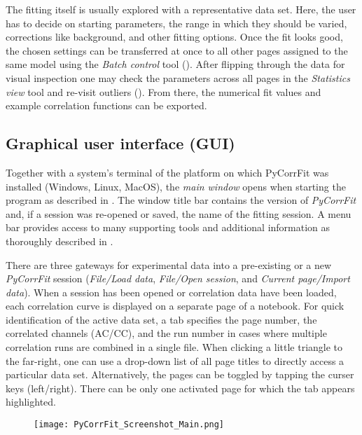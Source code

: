 The fitting itself is usually explored with a representative data set. Here, the user has to decide on starting parameters, the range in which they should be varied, corrections like background, and other fitting options. Once the fit looks good, the chosen settings can be transferred at once to all other pages assigned to the same model using the \textit{Batch control} tool (). After flipping through the data for visual inspection one may check the parameters across all pages in the \textit{Statistics view} tool and re-visit outliers (). From there, the numerical fit values and example correlation functions can be exported.

\subsection{Graphical user interface (GUI)}
\label{sec:intro.graph}

Together with a system's terminal of the platform on which PyCorrFit was installed (Windows, Linux, MacOS), the \textit{main window} opens when starting the program as described in . The window title bar contains the version of \textit{PyCorrFit} and, if a session was re-opened or saved, the name of the fitting session. A menu bar provides access to many supporting tools and additional information as thoroughly described in . 

There are three gateways for experimental data into a pre-existing or a new \textit{PyCorrFit} session (\textit{File/Load data}, \textit{File/Open session}, and \textit{Current page/Import data}). When a session has been opened or correlation data have been loaded, each correlation curve is displayed on a separate page of a notebook. For quick identification of the active data set, a tab specifies the page number, the correlated channels (AC/CC), and the run number in cases where  multiple correlation runs are combined in a single file. When clicking a little triangle to the far-right, one can use a drop-down list of all page titles to directly access a particular data set. Alternatively, the pages can be toggled by tapping the curser keys (left/right). There can be only one activated page for which the tab appears highlighted.

\begin{figure}[h]
\centering
\texttt{[image: PyCorrFit\_Screenshot\_Main.png]}
\end{figure}

